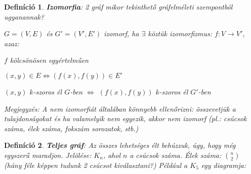 \documentclass[a4paper,12pt,twoside]{book}
\newtheorem{defi}{Definíció}[chapter]
\theoremstyle{break}
\begin{document}
\begin{defi}
 \textbf{Izomorfia}: 2 gráf mikor tekinthető gráfelméleti szempontból ugyanannak?
\begin{center}
\hspace*{2cm}
\end{center}
$G=(V,E)$ és $G'=(V',E')$ izomorf, ha $\exists$ köztük izomorfizmus: $f: V\to V'$, azaz:
  \begin{itemize*}
   \item $f$ kölcsönösen egyértelműen
   \item $(x,y)\in E \Leftrightarrow (f(x),f(y))\in E'$
   \item $(x,y)$ $k$-szoros él $G$-ben $\Leftrightarrow$ $(f(x),f(y))$ $k$-szoros él $G'$-ben
  \end{itemize*}
\emph{Megjegyzés}: A nem izomorfiát általában könnyebb ellenőrizni: összevetjük a tulajdonságokat és ha valamelyik nem egyezik, akkor nem izomorf (pl.: csúcsok száma, élek száma, fokszám sorozatok, stb.)
\end{defi}

\begin{defi}
 \textbf{Teljes gráf}: Az összes lehetséges élt behúzzuk, úgy, hogy még egyszerű maradjon. Jelölése: $K_n$, ahol $n$ a csúcsok száma. Élek száma: $\binom{n}{2}$ (hány féle képpen tudunk 2 csúcsot kiválasztani?) Például a $K_5$ egy diagramja:\\
\begin{center}
\end{center}
\end{defi}
\end{document}
